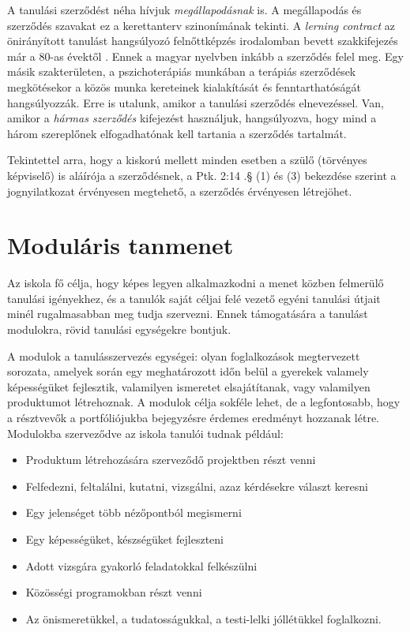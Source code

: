 A tanulási szerződést néha hívjuk \emph{megállapodásnak} is. A megállapodás és szerződés szavakat ez a kerettanterv szinonímának tekinti. A \emph{lerning contract} az önirányított tanulást hangsúlyozó felnőttképzés irodalomban
bevett szakkifejezés már a 80-as évektől \citep{Malcolm77}. Ennek a magyar nyelvben inkább a szerződés felel meg. Egy másik szakterületen, a pszichoterápiás munkában a terápiás szerződések megkötésekor a közös munka kereteinek kialakítását és fenntarthatóságát hangsúlyozzák. \citep{pszichoterapia} Erre is utalunk, amikor a tanulási szerződés elnevezéssel. Van, amikor a \emph{hármas szerződés} kifejezést használjuk, hangsúlyozva, hogy mind a három szereplőnek elfogadhatónak kell tartania a szerződés tartalmát.

Tekintettel arra, hogy a kiskorú mellett minden esetben a szülő (törvényes képviselő) is aláírója a szerződésnek, a Ptk. 2:14 .§ (1) és (3) bekezdése szerint a jognyilatkozat érvényesen megtehető, a szerződés érvényesen létrejöhet.

\section{Moduláris tanmenet}
\label{sec:modularis_tanmenet}

Az iskola fő célja, hogy képes legyen alkalmazkodni a menet közben felmerülő tanulási igényekhez, és a tanulók saját céljai felé vezető egyéni tanulási útjait minél rugalmasabban meg tudja szervezni. Ennek támogatására a tanulást modulokra, rövid tanulási egységekre bontjuk.

A modulok a tanulásszervezés egységei: olyan foglalkozások megtervezett sorozata, amelyek során egy meghatározott időn belül a gyerekek valamely képességüket fejlesztik, valamilyen ismeretet elsajátítanak, vagy valamilyen produktumot létrehoznak. A modulok célja sokféle lehet, de a legfontosabb, hogy a résztvevők a portfóliójukba bejegyzésre érdemes eredményt hozzanak létre. Modulokba szerveződve az iskola tanulói tudnak például:

\begin{itemize}
\item Produktum létrehozására szerveződő projektben részt venni
\item Felfedezni, feltalálni, kutatni, vizsgálni, azaz kérdésekre választ keresni
\item Egy jelenséget több nézőpontból megismerni
\item Egy képességüket, készségüket fejleszteni
\item Adott vizsgára gyakorló feladatokkal felkészülni
\item Közösségi programokban részt venni
\item Az önismeretükkel, a tudatosságukkal, a testi-lelki jóllétükkel foglalkozni.
\end{itemize}

